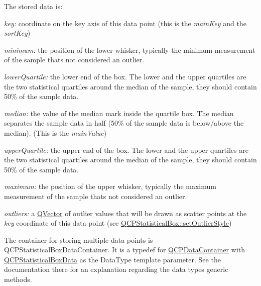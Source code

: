 The stored data is\+:

\begin{DoxyItemize}
\item {\itshape key\+:} coordinate on the key axis of this data point (this is the {\itshape main\+Key} and the {\itshape sort\+Key})\end{DoxyItemize}
\begin{DoxyItemize}
\item {\itshape minimum\+:} the position of the lower whisker, typically the minimum measurement of the sample that\textquotesingle{}s not considered an outlier.\end{DoxyItemize}
\begin{DoxyItemize}
\item {\itshape lower\+Quartile\+:} the lower end of the box. The lower and the upper quartiles are the two statistical quartiles around the median of the sample, they should contain 50\% of the sample data.\end{DoxyItemize}
\begin{DoxyItemize}
\item {\itshape median\+:} the value of the median mark inside the quartile box. The median separates the sample data in half (50\% of the sample data is below/above the median). (This is the {\itshape main\+Value})\end{DoxyItemize}
\begin{DoxyItemize}
\item {\itshape upper\+Quartile\+:} the upper end of the box. The lower and the upper quartiles are the two statistical quartiles around the median of the sample, they should contain 50\% of the sample data.\end{DoxyItemize}
\begin{DoxyItemize}
\item {\itshape maximum\+:} the position of the upper whisker, typically the maximum measurement of the sample that\textquotesingle{}s not considered an outlier.\end{DoxyItemize}
\begin{DoxyItemize}
\item {\itshape outliers\+:} a \hyperlink{class_q_vector}{Q\+Vector} of outlier values that will be drawn as scatter points at the {\itshape key} coordinate of this data point (see \hyperlink{class_q_c_p_statistical_box_ad5241943422eb8e58360a97e99ad6aa7}{Q\+C\+P\+Statistical\+Box\+::set\+Outlier\+Style})\end{DoxyItemize}
The container for storing multiple data points is Q\+C\+P\+Statistical\+Box\+Data\+Container. It is a typedef for \hyperlink{class_q_c_p_data_container}{Q\+C\+P\+Data\+Container} with \hyperlink{class_q_c_p_statistical_box_data}{Q\+C\+P\+Statistical\+Box\+Data} as the Data\+Type template parameter. See the documentation there for an explanation regarding the data type\textquotesingle{}s generic methods.

